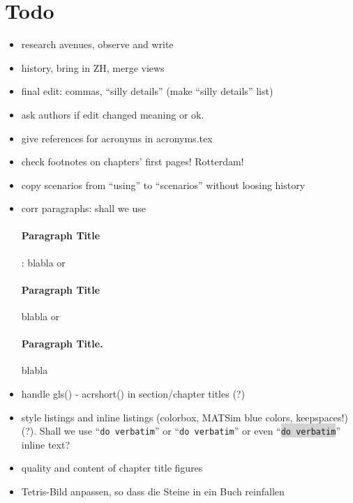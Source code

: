 \section*{Todo}

\begin{itemize}\styleItemize

\item research avenues, observe and write

\item history, bring in ZH, merge views

\item final edit: commas, ``silly details'' (make ``silly details'' list)

\item ask authors if edit changed meaning or ok.

\item give references for acronyms in acronyms.tex

\item check footnotes on chapters' first pages! Rotterdam!

\item copy scenarios from ``using'' to ``scenarios'' without loosing history

\item corr paragraphs: shall we use \paragraph{Paragraph Title}: blabla or \paragraph{Paragraph Title} blabla or \paragraph{Paragraph Title.} blabla

\item handle gls() - acrshort() in section/chapter titles (?)

\item style listings and inline listings (colorbox, MATSim blue colors, keepspaces!) (?). Shall we use ``\verb|do verbatim|'' or ``\lstinline|do verbatim|'' or even ``\colorbox{lightgray}{\lstinline|do verbatim|}'' inline text?

\item quality and content of chapter title figures

\item Tetris-Bild anpassen, so dass die Steine in ein Buch reinfallen


\end{itemize}
